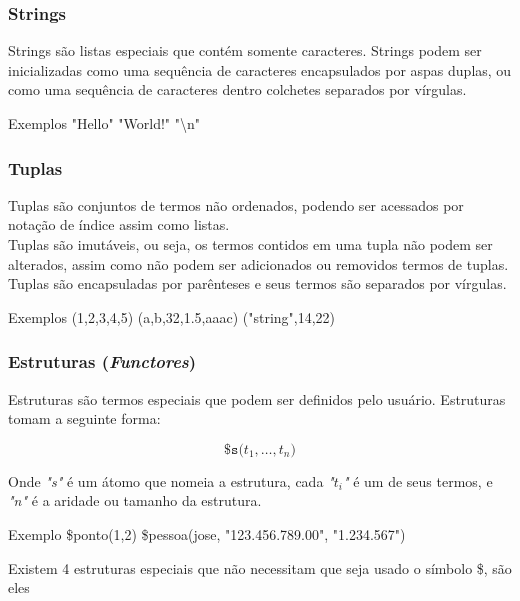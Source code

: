 
\begin{frame}
	\frametitle{Strings}
	
	Strings são listas especiais que contém somente caracteres. Strings podem ser inicializadas como uma 
	sequência de caracteres encapsulados por aspas duplas, ou como uma sequência de caracteres dentro 
	colchetes separados por vírgulas.
	
	\begin{exampleblock}{Exemplos}
		"Hello" \: "World!" \: "\textbackslash n" \: [o,l,a,"\:",m,u,n,d,o] 
	\end{exampleblock}
	
\end{frame}


\begin{frame}
	\frametitle{Tuplas}
	
	Tuplas são conjuntos de termos não ordenados, podendo ser acessados por notação de índice assim como
	listas.\\
	Tuplas são imutáveis, ou seja, os termos contidos em uma tupla não podem ser alterados, assim como
	não podem ser adicionados ou removidos termos de tuplas.\\
	Tuplas são encapsuladas por parênteses e seus termos são separados por vírgulas.
	
	\begin{exampleblock}{Exemplos}
		(1,2,3,4,5) \: (a,b,32,1.5,aaac) \: ("string",14,22)
	\end{exampleblock}
	
\end{frame}


\begin{frame}
	\frametitle{Estruturas (\textit{Functores})}
	
	Estruturas são termos especiais que podem ser definidos pelo usuário. Estruturas tomam a seguinte 
	forma: 
	
	\begin{displaymath}
	\texttt{{\$}s($t_1,\ldots,t_n$)}
	\end{displaymath}
	
	Onde \textit{"s"} é um átomo que nomeia a estrutura, cada 
	\textit{"$t_i$"} é um de seus termos, e \textit{"n"} é a aridade ou tamanho da estrutura.\\
	
	\begin{exampleblock}{Exemplo}
		\$ponto(1,2) \: \$pessoa(jose, "123.456.789.00", "1.234.567")
	\end{exampleblock}
	
	Existem 4 estruturas especiais que não necessitam que seja usado o símbolo \$, são eles
	
\end{frame}

